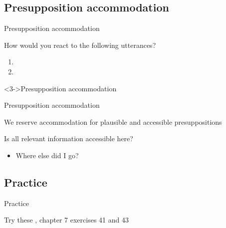 \documentclass{beamer}
\newcommand{\subonefour}{Presupposition accommodation}
\newcommand{\subonefive}{Practice}
\begin{document}
    \subsection{\subonefour}
      \begin{frame}{\subonefour}
        \begin{block}{How would you react to the following utterances?}
          \begin{enumerate}
            \item {}
            \item {}
          \end{enumerate}
        \end{block}
        \begin{alertblock}<3->{Presupposition accommodation}
          
        \end{alertblock}
      \end{frame}

      \begin{frame}{\subonefour}
        \begin{block}{}
          We reserve accommodation for plausible and accessible presuppositions
        \end{block}
        \begin{block}{Is all relevant information accessible here?}
          \begin{itemize}
            \item<2-> Where else did I go?
          \end{itemize}
        \end{block}
      \end{frame}

    \subsection{\subonefive}
      \begin{frame}{\subonefive}
        \begin{block}{Try these}
          \textcite{dawson_language_2016}, chapter 7 exercises 41 and 43
        \end{block}
      \end{frame}
\end{document}
